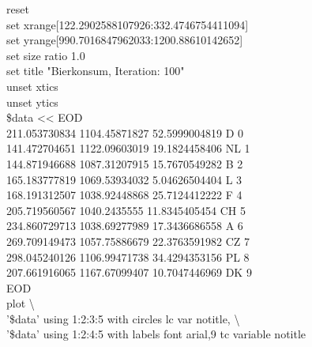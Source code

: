 \documentclass[a4paper,11pt]{article}
\newcommand*{\mybox}[2]{\colorbox{#1!30}{\parbox{.98\linewidth}{#2}}}
\begin{document}
{{\mybox{background}{
reset\\
set xrange[122.2902588107926:332.4746754411094]\\
set yrange[990.7016847962033:1200.88610142652]\\
set size ratio 1.0\\
set title "Bierkonsum, Iteration: 100"\\
unset xtics\\
unset ytics\\
\$data << EOD\\
211.053730834 1104.45871827 52.5999004819 D 0\\
141.472704651 1122.09603019 19.1824458406 NL 1\\
144.871946688 1087.31207915 15.7670549282 B 2\\
165.183777819 1069.53934032 5.04626504404 L 3\\
168.191312507 1038.92448868 25.7124412222 F 4\\
205.719560567 1040.2435555 11.8345405454 CH 5\\
234.860729713 1038.69277989 17.3436686558 A 6\\
269.709149473 1057.75886679 22.3763591982 CZ 7\\
298.045240126 1106.99471738 34.4294353156 PL 8\\
207.661916065 1167.67099407 10.7047446969 DK 9\\
EOD\\
plot \textbackslash \\
'\$data' using 1:2:3:5 with circles lc var notitle, \textbackslash \\
'\$data' using 1:2:4:5 with labels font \grqq{}arial,9\grqq{} tc variable notitle\\
}
}
}
\end{document}
